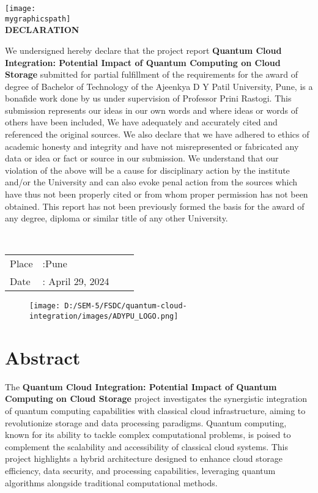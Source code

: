\documentclass[12pt,a4paper]{article}
\newcommand{\mygraphicspath}{D:/SEM-5/FSDC/quantum-cloud-integration/images/ADYPU_LOGO.png}
\newcommand{\vtitle}{Quantum Cloud Integration: Potential Impact of Quantum Computing on Cloud Storage}
\newcommand{\vguide}{Professor Prini Rastogi}
\begin{document}
\begin{center}
    \texttt{[image: \\mygraphicspath]}\\[2cm]
    \fontsize{14}{16}\selectfont \bfseries
    DECLARATION
    \end{center}
    We undersigned hereby declare that the project report 
    {\bfseries \vtitle} submitted for
    partial fulfillment of the requirements for the award of degree of Bachelor of Technology of
    the Ajeenkya D Y Patil University, Pune, is a bonafide work done by us
    under supervision of \vguide. This submission represents our ideas in
    our own words and where ideas or words of others have been included, We have adequately
    and accurately cited and referenced the original sources. We also declare that we have
    adhered to ethics of academic honesty and integrity and have not misrepresented or
    fabricated any data or idea or fact or source in our submission. We understand that our
    violation of the above will be a cause for disciplinary action by the institute and/or the
    University and can also evoke penal action from the sources which have thus not been
    properly cited or from whom proper permission has not been obtained. This report has
    not been previously formed the basis for the award of any degree, diploma or similar title
    of any other University. 
    
    \qquad\\[1cm]
    \begin{tabular}{llll}
    Place&:\enspace Pune \qquad  \\
    Date&: April 29, 2024 
    \end{tabular}
    

\newpage



{\begin{figure}[!h]
    \centering
    \texttt{[image: D:/SEM-5/FSDC/quantum-cloud-integration/images/ADYPU\_LOGO.png]}
\end{figure}}

\section*{Abstract}

The \textbf{Quantum Cloud Integration: Potential Impact of Quantum Computing on Cloud Storage} project investigates the synergistic integration of quantum computing capabilities with classical cloud infrastructure, aiming to revolutionize storage and data processing paradigms. Quantum computing, known for its ability to tackle complex computational problems, is poised to complement the scalability and accessibility of classical cloud systems. This project highlights a hybrid architecture designed to enhance cloud storage efficiency, data security, and processing capabilities, leveraging quantum algorithms alongside traditional computational methods.  
\end{document}
